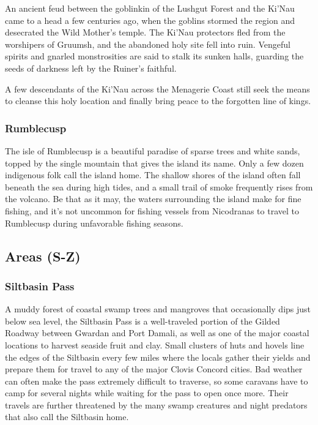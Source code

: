 \documentclass[10pt,a4paper,twoside,bg=print,twocolumn,openany,nodeprecatedcode]{dndbook}
\begin{document}
An ancient feud between the goblinkin of the Lushgut Forest and the Ki'Nau came to a head a few centuries ago, when the goblins stormed the region and desecrated the Wild Mother's temple. The Ki'Nau protectors fled from the worshipers of Gruumsh, and the abandoned holy site fell into ruin. Vengeful spirits and gnarled monstrosities are said to stalk its sunken halls, guarding the seeds of darkness left by the Ruiner's faithful.

A few descendants of the Ki'Nau across the Menagerie Coast still seek the means to cleanse this holy location and finally bring peace to the forgotten line of kings.

\subsubsection{Rumblecusp}
The isle of Rumblecusp is a beautiful paradise of sparse trees and white sands, topped by the single mountain that gives the island its name. Only a few dozen indigenous folk call the island home. The shallow shores of the island often fall beneath the sea during high tides, and a small trail of smoke frequently rises from the volcano. Be that as it may, the waters surrounding the island make for fine fishing, and it's not uncommon for fishing vessels from Nicodranas to travel to Rumblecusp during unfavorable fishing seasons.

\subsection{Areas (S-Z)}
\subsubsection{Siltbasin Pass}
A muddy forest of coastal swamp trees and mangroves that occasionally dips just below sea level, the Siltbasin Pass is a well-traveled portion of the Gilded Roadway between Gwardan and Port Damali, as well as one of the major coastal locations to harvest seaside fruit and clay. Small clusters of huts and hovels line the edges of the Siltbasin every few miles where the locals gather their yields and prepare them for travel to any of the major Clovis Concord cities. Bad weather can often make the pass extremely difficult to traverse, so some caravans have to camp for several nights while waiting for the pass to open once more. Their travels are further threatened by the many swamp creatures and night predators that also call the Siltbasin home.
\end{document}
